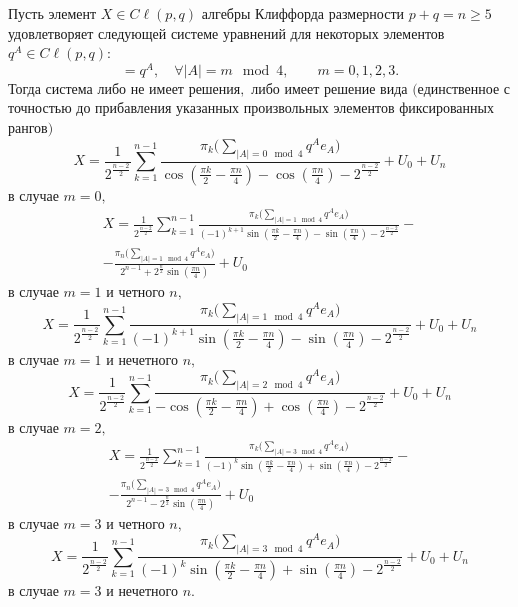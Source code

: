 \begin{theorem}[10]Пусть элемент $X\in {{C}\!\ell}(p,q)$ алгебры Клиффорда размерности $p+q=n\geq 5$ удовлетворяет следующей системе уравнений для некоторых элементов $q^A\in{{C}\!\ell}(p,q){:}$
\begin{equation}
[e^A, X]=q^A,\quad \forall |A|=m\mod 4,\qquad m=0, 1, 2, 3.
\end{equation}
Тогда система либо не имеет ре\-ше\-ния$,$ либо имеет решение вида $($единст\-вен\-ное с точностью до прибавления указанных произвольных элементов фиксированных рангов$)$
$$
X=\frac{1}{2^{\frac{n-2}{2}}}\sum_{k=1}^{n-1}\frac{\pi_k\bigl(\sum_{|A|=0\mod 4}q^A e_A\bigr)}{\cos(\frac{\pi k}{2}- \frac{\pi n}{4})-\cos(\frac{\pi n}{4})-2^{\frac{n-2}{2}}}+U_0+U_n
$$
в случае $m=0,$
\begin{multline}
X=\frac{1}{2^{\frac{n-2}{2}}}\sum_{k=1}^{n-1}\frac{\pi_k\bigl(\sum_{|A|=1\mod 4}q^A e_A\bigr)}{(-1)^{k+1}\sin(\frac{\pi k}{2}-\frac{\pi n}{4})-\sin(\frac{\pi n}{4})-2^{\frac{n-2}{2}}}-
\\
-
\frac{\pi_n\bigl(\sum_{|A|=1\mod 4}q^A e_A\bigr)}{2^{n-1}+2^{\frac{n}{2}}\sin(\frac{\pi n}{4})}+U_0
\end{multline}
в случае $m=1$ и четного $n,$
$$X=\frac{1}{2^{\frac{n-2}{2}}}\sum_{k=1}^{n-1}\frac{\pi_k\bigl(\sum_{|A|=1\mod 4}q^A e_A\bigr)}{(-1)^{k+1}\sin(\frac{\pi k}{2}-\frac{\pi n}{4})-\sin(\frac{\pi n}{4})-2^{\frac{n-2}{2}}}+U_0+U_n$$
в случае $m=1$ и нечетного $n,$
$$X=\frac{1}{2^{\frac{n-2}{2}}}\sum_{k=1}^{n-1}\frac{\pi_k\bigl(\sum_{|A|=2\mod 4}q^A e_A\bigr)}{-\cos(\frac{\pi k}{2}-\frac{\pi n}{4})+\cos(\frac{\pi n}{4})-2^{\frac{n-2}{2}}}+U_0+U_n$$
в случае $m=2,$
\begin{multline}
X=\frac{1}{2^{\frac{n-2}{2}}}\sum_{k=1}^{n-1}\frac{\pi_k\bigl(\sum_{|A|=3\mod 4}q^A e_A\bigr)}{(-1)^{k}\sin(\frac{\pi k}{2}-\frac{\pi n}{4})+\sin(\frac{\pi n}{4})-2^{\frac{n-2}{2}}}- \\
- \frac{\pi_n\bigl(\sum_{|A|=3\mod 4}q^A e_A\bigr)}{2^{n-1}-2^{\frac{n}{2}}\sin(\frac{\pi n}{4})}+U_0
\end{multline}
в случае $m=3$ и четного $n,$
$$X=\frac{1}{2^{\frac{n-2}{2}}}\sum_{k=1}^{n-1}\frac{\pi_k\bigl(\sum_{|A|=3\mod 4}q^A e_A\bigr)}{(-1)^{k}\sin(\frac{\pi k}{2}-\frac{\pi n}{4})+\sin(\frac{\pi n}{4})-2^{\frac{n-2}{2}}}+U_0+U_n$$
в случае $m=3$ и нечетного $n.$
\end{theorem}

\smallskip

